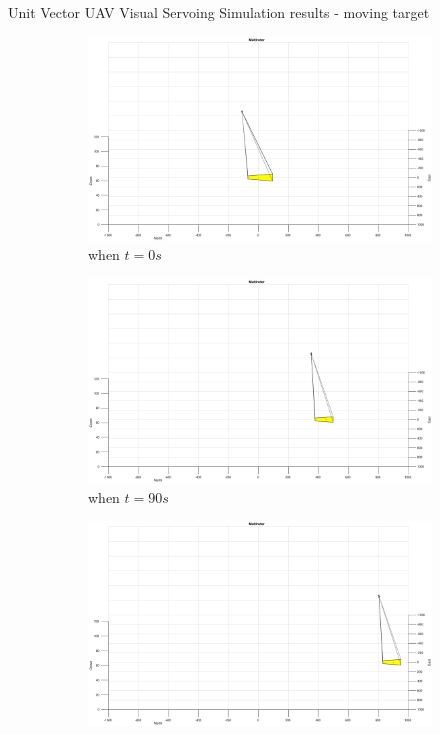 \documentclass[9pt]{beamer}
\begin{document}
\begin{frame}{Unit Vector UAV Visual Servoing}
Simulation results - moving target
\begin{figure}[htbp]
	\centering
	\begin{subfigure}[t]{0.32\linewidth}
		\includegraphics[width=\textwidth]{chapter4/image_UAV_5mps}
		\caption{when $t=0s$}
	\end{subfigure}
	\begin{subfigure}[t]{0.32\linewidth}
		\includegraphics[width=\textwidth]{chapter4/image_UAV_5mps_90s}
		\caption{when $t=90s$}
	\end{subfigure}
	\begin{subfigure}[t]{0.32\linewidth}
		\includegraphics[width=\textwidth]{chapter4/image_UAV_5mps_180s}

\end{subfigure}
\end{figure}
\end{frame}
\end{document}
